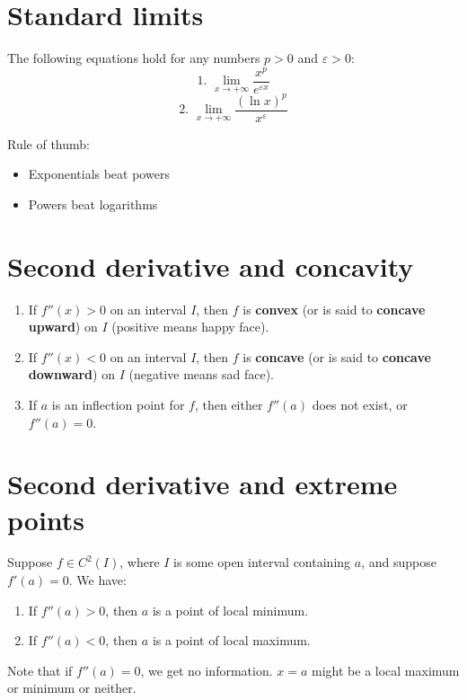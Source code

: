 \documentclass[11pt]{article}
\begin{document}
\newpage

\section{Standard limits}
\label{sec:org790c0d6}
The following equations hold for any numbers \(p > 0\) and \(\varepsilon > 0\):
\[\text{1. } \lim_{x \rightarrow +\infty} \frac{x^p}{e^{\varepsilon x}}\]
\[\text{2. } \lim_{x \rightarrow +\infty} \frac{(\ln x)^p}{x^{\varepsilon}}\]

Rule of thumb:
\begin{itemize}
\item Exponentials beat powers
\item Powers beat logarithms
\end{itemize}


\section{Second derivative and concavity}
\label{sec:org7b6bf2c}
\begin{enumerate}
\item If \(f''(x) > 0\) on an interval \(I\), then \(f\) is \textbf{convex} (or is said to \textbf{concave upward}) on \(I\) (positive means happy face).
\item If \(f''(x) < 0\) on an interval \(I\), then \(f\) is \textbf{concave} (or is said to \textbf{concave downward}) on \(I\) (negative means sad face).
\item If \(a\) is an inflection point for \(f\), then either \(f''(a)\) does not exist, or \(f''(a) = 0\).
\end{enumerate}


\section{Second derivative and extreme points}
\label{sec:org9b25b29}
Suppose \(f \in C^2(I)\), where \(I\) is some open interval containing \(a\), and suppose \(f'(a) = 0\). We have:
\begin{enumerate}
\item If \(f''(a) > 0\), then \(a\) is a point of local minimum.
\item If \(f''(a) < 0\), then \(a\) is a point of local maximum.
\end{enumerate}

Note that if \(f''(a) = 0\), we get no information. \(x = a\) might be a local maximum or minimum or neither.
\end{document}
